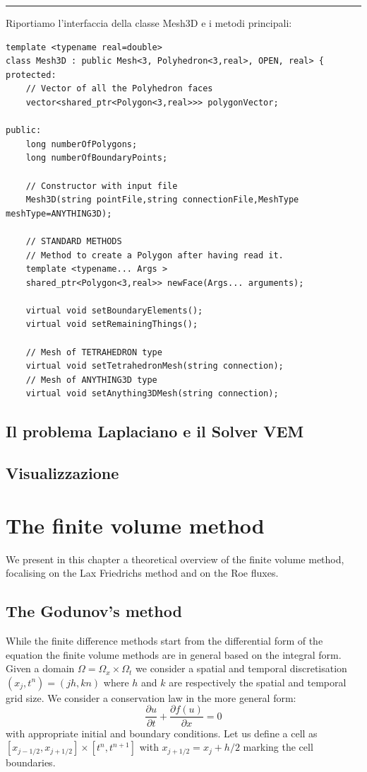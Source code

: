 \documentclass[oneside,12pt]{book}  %
\theoremstyle{plain}
\theoremstyle{definition}
\theoremstyle{remark}
\numberwithin{equation}{chapter} %
\begin{document}
\noindent\rule{14cm}{1pt}

Riportiamo l'interfaccia della classe Mesh3D e i metodi principali:

\begin{verbatim}
template <typename real=double>
class Mesh3D : public Mesh<3, Polyhedron<3,real>, OPEN, real> {
protected:
    // Vector of all the Polyhedron faces
    vector<shared_ptr<Polygon<3,real>>> polygonVector;  

public:
    long numberOfPolygons;
    long numberOfBoundaryPoints;

    // Constructor with input file
    Mesh3D(string pointFile,string connectionFile,MeshType meshType=ANYTHING3D);
	
    // STANDARD METHODS
    // Method to create a Polygon after having read it.
    template <typename... Args >
    shared_ptr<Polygon<3,real>> newFace(Args... arguments);

    virtual void setBoundaryElements();
    virtual void setRemainingThings();

    // Mesh of TETRAHEDRON type
    virtual void setTetrahedronMesh(string connection);
    // Mesh of ANYTHING3D type
    virtual void setAnything3DMesh(string connection);

\end{verbatim}

\section{Il problema Laplaciano e il Solver VEM}
\label{sec:solver}

\section{Visualizzazione}
\label{sec:visualizzazione}



\chapter{The finite volume method}
We present in this chapter a theoretical overview of the finite volume
method, focalising on the Lax Friedrichs method and on the Roe
fluxes. 
\section{The Godunov's method}
While the finite difference methods start from the differential form
of the equation the finite volume methods are in general based on the
integral form.
Given a domain $\Omega=\Omega_x\times \Omega_t$ we consider a spatial
and temporal discretisation $(x_j,t^n)=(jh,kn)$ where $h$ and $k$ are
respectively the spatial and temporal grid size.
We consider a conservation law in the more general form:
\begin{equation}
  \label{eq:conservation_law}
  \frac{\partial u}{\partial t}+\frac{\partial f(u)}{\partial x}=0
\end{equation}
with appropriate initial and boundary conditions.
Let us define a cell as $[x_{j-1/2},x_{j+1/2}]\times [t^n,t^{n+1}]$
with $x_{j+1/2}=x_j+h/2$ marking the cell boundaries. 
\end{document}
